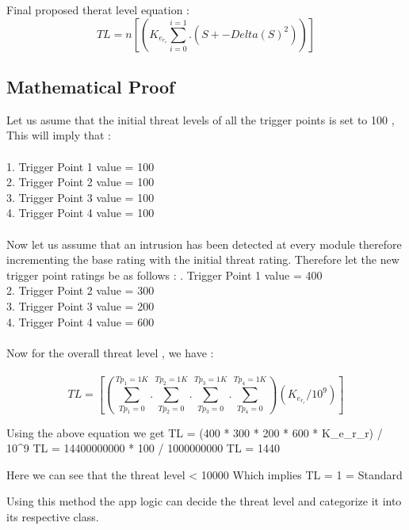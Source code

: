 \documentclass[letterpaper, 10 pt, conference]{ieeeconf}  %
\begin{document}
Final proposed therat level equation :
\begin{equation}
TL = n[(K_e_r_r \sum_{i=0}^{i=1} . (S +- Delta(S)^2) )]
\end{equation}

\subsection{Mathematical Proof}
Let us asume that the initial threat levels of all the trigger points is set to 100 , This will imply that : \\ \\
1. Trigger Point 1 value = 100 \\
2. Trigger Point 2 value = 100 \\
3. Trigger Point 3 value = 100 \\
4. Trigger Point 4 value = 100 \\ \\

Now let us assume that an intrusion has been detected at every module therefore incrementing the base rating with the initial threat rating. \n
Therefore let the new trigger point ratings be as follows : . Trigger Point 1 value = 400 \\
2. Trigger Point 2 value = 300 \\
3. Trigger Point 3 value = 200 \\
4. Trigger Point 4 value = 600 \\ \\

Now for the overall threat level , we have : \\ \\
\begin{equation}
TL = [{(\sum_{Tp_1=0}^{Tp_1=1K} . \sum_{Tp_2=0}^{Tp_2=1K} . \sum_{Tp_3=0}^{Tp_3=1K} . \sum_{Tp_4=0}^{Tp_4=1K}) (K_e_r_r / 10^9)}]
\end{equation}

\n Using the above equation we get \n
TL = (400 * 300 * 200 * 600 * K_e_r_r) / 10^9 \n
TL = 14400000000 * 100 / 1000000000 \n
TL = 1440 \n

Here we can see that the threat level < 10000 \n
Which implies TL = 1 = Standard \n

Using this method the app logic can decide the threat level and categorize it into its respective class.
\end{document}
